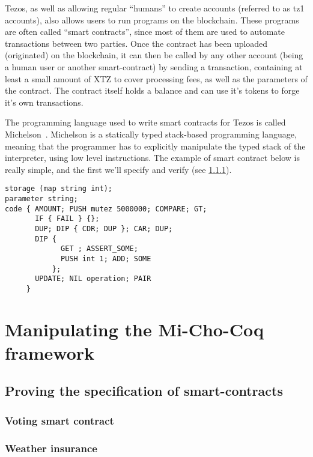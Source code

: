 \documentclass{report}
\begin{document}
Tezos, as well as allowing regular ``humans'' to create accounts (referred to as tz1 accounts), also allows users to run programs on the blockchain. These programs are often called ``smart contracts'', since most of them are used to automate transactions between two parties. Once the contract has been uploaded (originated) on the blockchain, it can then be called by any other account (being a human user or another smart-contract) by sending a transaction, containing at least a small amount of XTZ to cover processing fees, as well as the parameters of the contract. The contract itself holds a balance and can use it's tokens to forge it's own transactions.

The programming language used to write smart contracts for Tezos is called Michelson~\cite{michelsonwhitedoc}. Michelson is a statically typed stack-based programming language, meaning that the programmer has to explicitly manipulate the typed stack of the interpreter, using low level instructions. The example of smart contract below is really simple, and the first we'll specify and verify (see \ref{voteVerif}).

\begin{lstlisting}
storage (map string int);
parameter string;
code { AMOUNT; PUSH mutez 5000000; COMPARE; GT;
       IF { FAIL } {};
       DUP; DIP { CDR; DUP }; CAR; DUP;
       DIP {
             GET ; ASSERT_SOME;
             PUSH int 1; ADD; SOME
           };
       UPDATE; NIL operation; PAIR
     }
\end{lstlisting}

\chapter{Manipulating the Mi-Cho-Coq framework}

\section{Proving the specification of smart-contracts}

\subsection{Voting smart contract}
\label{voteVerif}

\subsection{Weather insurance}
\end{document}

